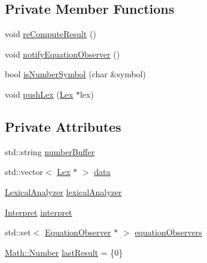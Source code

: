 \subsection*{Private Member Functions}
\begin{DoxyCompactItemize}
\item 
void \hyperlink{classteam22_1_1_calc_1_1_equation_aba44b10dfb0ece96f3e0279d34cec868}{re\+Compute\+Result} ()
\item 
void \hyperlink{classteam22_1_1_calc_1_1_equation_acb90f7fefbd20c57864de0ed691bb65f}{notify\+Equation\+Observer} ()
\item 
bool \hyperlink{classteam22_1_1_calc_1_1_equation_afa4b44cfa408f74370851f7f64f55743}{is\+Number\+Symbol} (char \&symbol)
\item 
void \hyperlink{classteam22_1_1_calc_1_1_equation_af17ea6795813114d578e17109325d5e9}{push\+Lex} (\hyperlink{classteam22_1_1_calc_1_1_lex}{Lex} $\ast$lex)
\end{DoxyCompactItemize}
\subsection*{Private Attributes}
\begin{DoxyCompactItemize}
\item 
std\+::string \hyperlink{classteam22_1_1_calc_1_1_equation_a816d00b732bc472768b41da216a4335c}{number\+Buffer}
\item 
std\+::vector$<$ \hyperlink{classteam22_1_1_calc_1_1_lex}{Lex} $\ast$ $>$ \hyperlink{classteam22_1_1_calc_1_1_equation_ab02c12c6e452d5271f26bbae073ed4dc}{data}
\item 
\hyperlink{classteam22_1_1_calc_1_1_lexical_analyzer}{Lexical\+Analyzer} \hyperlink{classteam22_1_1_calc_1_1_equation_a65aeaa2a279994b03517a22addf31fc1}{lexical\+Analyzer}
\item 
\hyperlink{classteam22_1_1_calc_1_1_interpret}{Interpret} \hyperlink{classteam22_1_1_calc_1_1_equation_a8812a84e9c0f194eba491b0dba0cb015}{interpret}
\item 
std\+::set$<$ \hyperlink{classteam22_1_1_calc_1_1_equation_observer}{Equation\+Observer} $\ast$ $>$ \hyperlink{classteam22_1_1_calc_1_1_equation_a76439666b11701dd1c42507397c5a316}{equation\+Observers}
\item 
\hyperlink{classteam22_1_1_math_1_1_number}{Math\+::\+Number} \hyperlink{classteam22_1_1_calc_1_1_equation_a7c62440412a33b3b3300e63ff65ffafb}{last\+Result} = \{0\}
\end{DoxyCompactItemize}

